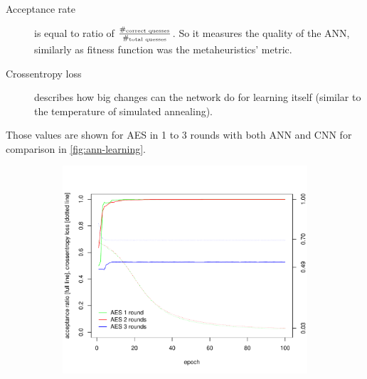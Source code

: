 \documentclass[
  print, %
  Table,   %
  nolof,     %
  nolot,     %
  11pt, %
  oneside  %
]{fithesis3}
\begin{document}
\begin{description}
    \item[Acceptance rate] is equal to ratio of $\frac{\#_{\textnormal{correct quesses}}}{\#_{\textnormal{total quesses}}}$. So it measures the quality of the ANN, similarly as fitness function was the metaheuristics' metric.
    \item[Crossentropy loss] describes how big changes can the network do for learning itself (similar to the temperature of simulated annealing).
\end{description}

Those values are shown for AES in 1 to 3 rounds with both ANN and CNN for comparison in \cref{fig:ann-learning}.


\begin{figure}[H]
\begin{changemargin}{-3cm}{-3cm}
\centering
\begin{subfigure}{.6\textwidth}
  \centering
  \includegraphics[width=.98\textwidth]{./graphics/ann/ann}
  \label{fig:ann-learning-ann}
\end{subfigure}%
\begin{subfigure}{.6\textwidth}
  \centering

\end{subfigure}
\end{changemargin}
\end{figure}
\end{document}
